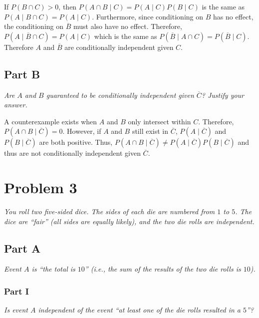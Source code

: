 \documentclass{article}
\begin{document}
\bigbreak

If $ P ( B \cap C ) > 0 $, then $ P (A \cap B \mid C) = P (A \mid C) P(B \mid C)
$ is the same as $ P(A \mid B \cap C) = P(A \mid C) $. Furthermore, since
conditioning on $ B $ has no effect, the conditioning on $ \overline{B} $ must
also have no effect. Therefore, $ P(A \mid \overline{B} \cap C) = P(A \mid C) $
which is the same as $ P(\overline{B} \mid A \cap C) = P(\overline{B} \mid C) $.
Therefore $ A $ and $ \overline{B} $ are conditionally independent given $ C $.

\subsection*{Part B}

\textit{Are $ A $ and $ B $ guaranteed to be conditionally independent given $
\overline{C} $? Justify your answer.}

\bigbreak

A counterexample exists when $ A $ and $ B $ only intersect within $ C $.
Therefore, $ P(A \cap B \mid \overline{C}) = 0 $. However, if $ A $ and $ B $
still exist in $ \overline{C} $, $ P(A \mid \overline{C}) $ and $ P(B \mid
\overline{C}) $ are both positive. Thus, $ P(A \cap B \mid \overline{C}) \neq
P(A \mid \overline{C}) P(B \mid \overline{C}) $ and thus are not conditionally
independent given $ \overline{C} $.

\section*{Problem 3}

\textit{You roll two five-sided dice. The sides of each die are numbered from $
1 $ to $ 5 $. The dice are “fair” (all sides are equally likely), and the two
die rolls are independent.}

\subsection*{Part A}

\textit{Event $ A $ is “the total is $ 10 $” (i.e., the sum of the results of
the two die rolls is $ 10 $).}

\subsubsection*{Part I}

\textit{Is event $ A $ independent of the event “at least one of the die rolls
resulted in a $ 5 $”?}
\end{document}
